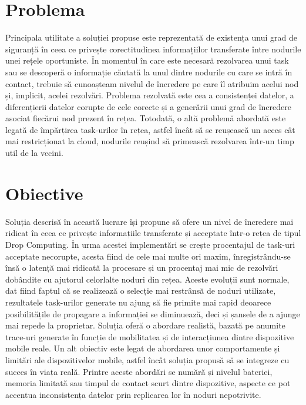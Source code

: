 \documentclass[12pt,a4paper]{report}
\begin{document}
\section{Problema} 
Principala utilitate a soluției propuse este reprezentată de existența unui grad de siguranță în ceea ce privește corectitudinea informațiilor transferate între nodurile unei rețele oportuniste. În momentul în care este necesară rezolvarea unui task sau se descoperă o informație căutată la unul dintre nodurile cu care se intră în contact, trebuie să cunoașteam nivelul de încredere pe care îl atribuim acelui nod și, implicit, acelei rezolvări. Problema rezolvată este cea a consistenței datelor, a diferențierii datelor corupte de cele corecte și a generării unui grad de încredere asociat fiecărui nod prezent în rețea. Totodată, o altă problemă abordată este legată de împărțirea task-urilor în rețea, astfel încât să se reușească un acces cât mai restricționat la cloud, nodurile reușind să primească rezolvarea într-un timp util de la vecini.

\section{Obiective}
Soluția descrisă în această lucrare își propune să ofere un nivel de încredere mai ridicat în ceea ce privește informațiile transferate și acceptate într-o rețea de tipul Drop Computing. În urma acestei implementări se crește procentajul de task-uri acceptate necorupte, acesta fiind de cele mai multe ori maxim, înregistrându-se însă o latență mai ridicată la procesare și un procentaj mai mic de rezolvări dobândite cu ajutorul celorlalte noduri din rețea. Aceste evoluții sunt normale, dat fiind faptul că se realizează o selecție mai restrânsă de noduri utilizate, rezultatele task-urilor generate nu ajung să fie primite mai rapid deoarece posibilitățile de propagare a informației se diminuează, deci și șansele de a ajunge mai repede la proprietar. Soluția oferă o abordare realistă, bazată pe anumite trace-uri generate în funcție de mobilitatea și de interacțiunea dintre dispozitive mobile reale. Un alt obiectiv este legat de abordarea unor comportamente și limitări ale dispozitivelor mobile, astfel încât soluția propusă să se integreze cu succes în viața reală. Printre aceste abordări se numără și nivelul bateriei, memoria limitată sau timpul de contact scurt dintre dispozitive, aspecte ce pot accentua inconsistența datelor prin replicarea lor în noduri nepotrivite.
\end{document}
